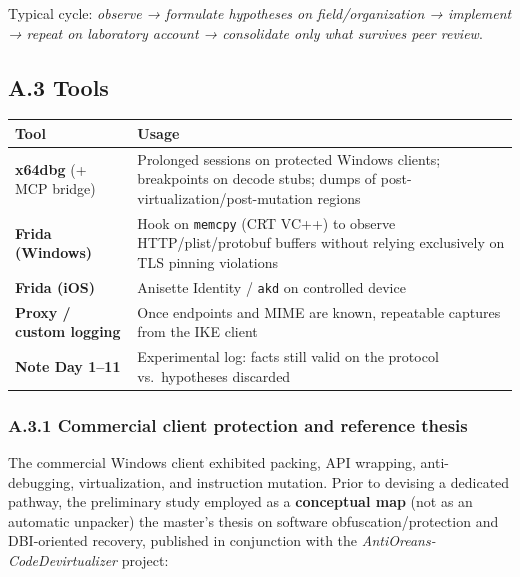 \documentclass[
  english,
  10pt]{article}
\newcounter{none} %
\begin{document}
Typical cycle: \emph{observe → formulate hypotheses on
field/organization → implement → repeat on laboratory account →
consolidate only what survives peer review}.

\subsection{A.3 Tools}\label{a.3-tools}

{\def\LTcaptype{none} %
\begin{longtable}[]{@{}
  >{\raggedright\arraybackslash}p{}
  >{\raggedright\arraybackslash}p{}@{}}
\toprule\noalign{}
\begin{minipage}[b]{\linewidth}\raggedright
Tool
\end{minipage} & \begin{minipage}[b]{\linewidth}\raggedright
Usage
\end{minipage} \\
\midrule\noalign{}
\endhead
\bottomrule\noalign{}
\endlastfoot
\textbf{x64dbg} (+ MCP bridge) & Prolonged sessions on protected Windows
clients; breakpoints on decode stubs; dumps of
post-virtualization/post-mutation regions \\
\textbf{Frida (Windows)} & Hook on \texttt{memcpy} (CRT VC++) to observe
HTTP/plist/protobuf buffers without relying exclusively on TLS pinning
violations \\
\textbf{Frida (iOS)} & Anisette Identity / \texttt{akd} on controlled
device \\
\textbf{Proxy / custom logging} & Once endpoints and MIME are known,
repeatable captures from the IKE client \\
\textbf{Note Day 1--11} & Experimental log: facts still valid on the
protocol vs.~hypotheses discarded \\
\end{longtable}
}

\subsubsection{A.3.1 Commercial client protection and reference
thesis}\label{a.3.1-commercial-client-protection-and-reference-thesis}

The commercial Windows client exhibited packing, API wrapping,
anti-debugging, virtualization, and instruction mutation. Prior to
devising a dedicated pathway, the preliminary study employed as a
\textbf{conceptual map} (not as an automatic unpacker) the master's
thesis on software obfuscation/protection and DBI-oriented recovery,
published in conjunction with the \emph{AntiOreans-CodeDevirtualizer}
project:
\end{document}
